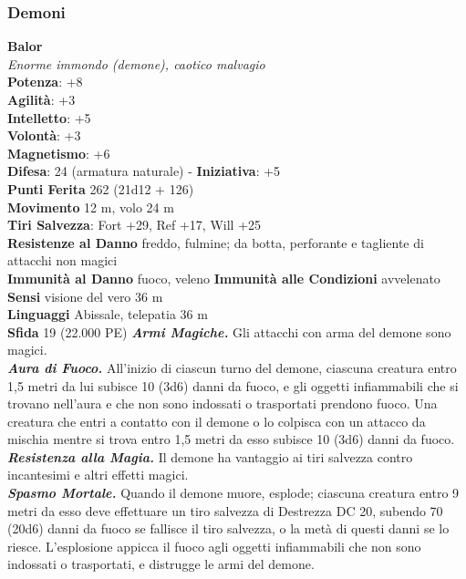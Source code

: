 \begin{multicols}{2}
\subsubsection{Demoni}

\medskip\textbf{Balor}\\
\emph{Enorme immondo (demone), caotico malvagio}\\
\textbf{Potenza}: +8\\
\textbf{Agilità}: +3\\
\textbf{Intelletto}: +5\\
\textbf{Volontà}: +3\\
\textbf{Magnetismo}: +6\\
\textbf{Difesa}: 24 (armatura naturale) - \textbf{Iniziativa}: +5\\
\textbf{Punti Ferita} 262 (21d12 + 126)\\
\textbf{Movimento} 12 m, volo 24 m\\
\textbf{Tiri Salvezza}: Fort +29, Ref +17, Will +25\\
\textbf{Resistenze al Danno} freddo, fulmine; da botta, perforante e tagliente di attacchi non magici\\ 
\textbf{Immunità al Danno} fuoco, veleno \textbf{Immunità alle Condizioni} avvelenato\\
\textbf{Sensi} visione del vero 36 m\\
\textbf{Linguaggi} Abissale, telepatia 36 m\\
\textbf{Sfida} 19 (22.000 PE)\smallskip
\emph{\textbf{Armi Magiche.}} Gli attacchi con arma del demone sono magici.\\
\emph{\textbf{Aura di Fuoco.}} All'inizio di ciascun turno del demone, ciascuna creatura entro 1,5 metri da lui subisce 10 (3d6) danni da fuoco, e gli oggetti infiammabili che si trovano nell'aura e che non sono indossati o trasportati prendono fuoco. Una creatura che entri a contatto con il demone o lo colpisca con un attacco da mischia mentre si trova entro 1,5 metri da esso subisce 10 (3d6) danni da fuoco.\\
\emph{\textbf{Resistenza alla Magia.}} Il demone ha vantaggio ai tiri salvezza contro incantesimi e altri effetti magici.\\
\emph{\textbf{Spasmo Mortale.}} Quando il demone muore, esplode; ciascuna creatura entro 9 metri da esso deve effettuare un tiro salvezza di Destrezza DC 20, subendo 70 (20d6) danni da fuoco se fallisce il tiro salvezza, o la metà di questi danni se lo riesce. L'esplosione appicca il fuoco agli oggetti infiammabili che non sono indossati o trasportati, e distrugge le armi del demone. \\

\end{multicols}
